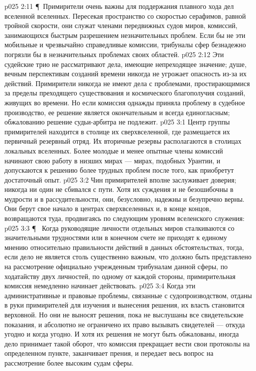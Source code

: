 \vs p025 2:11 \P\ Примирители очень важны для поддержания плавного хода дел вселенной вселенных. Пересекая пространство со скоростью серафимов, равной тройной скорости, они служат членами передвижных судов миров, комиссий, занимающихся быстрым разрешением незначительных проблем. Если бы не эти мобильные и чрезвычайно справедливые комиссии, трибуналы сфер безнадежно погрязли бы в незначительных проблемах своих областей.
\vs p025 2:12 Эти судейские трио не рассматривают дела, имеющие непреходящее значение; душе, вечным перспективам созданий времени никогда не угрожает опасность из\hyp{}за их действий. Примирители никогда не имеют дела с проблемами, простирающимися за пределы преходящего существования и космического благополучия созданий, живущих во времени. Но если комиссия однажды приняла проблему в судебное производство, ее решение является окончательным и всегда единогласным; обжалованию решение судьи\hyp{}арбитра не подлежит.
\vs p025 3:1 Центр группы примирителей находится в столице их сверхвселенной, где размещается их первичный резервный отряд. Их вторичные резервы располагаются в столицах локальных вселенных. Более молодые и менее опытные члены комиссий начинают свою работу в низших мирах --- мирах, подобных Урантии, и допускаются к решению более трудных проблем после того, как приобретут достаточный опыт.
\vs p025 3:2 Чин примирителей вполне заслуживает доверия; никогда ни один не сбивался с пути. Хотя их суждения и не безошибочны в мудрости и в рассудительности, они, безусловно, надежны и безупречно верны. Они берут свое начало в центрах сверхвселенных и, в конце концов, возвращаются туда, продвигаясь по следующим уровням вселенского служения:
\vs p025 3:3 \P\ \bibnobreakspace {} Когда руководящие личности отдельных миров сталкиваются со значительными трудностями или в конечном счете не приходят к единому мнению относительно правильности действий в данных обстоятельствах, тогда, если дело не является столь существенно важным, что должно быть представлено на рассмотрение официально учрежденным трибуналам данной сферы, по ходатайству двух личностей, по одному от каждой стороны, примирительная комиссия немедленно начинает действовать.
\vs p025 3:4 Когда эти административные и правовые проблемы, связанные с судопроизводством, отданы в руки примирителей для изучения и вынесения решения, их власть становится верховной. Но они не выносят решения, пока не выслушаны все свидетельские показания, и абсолютно не ограничено их право вызывать свидетелей --- откуда угодно и когда угодно. И хотя их решения не могут быть обжалованы, иногда дело принимает такой оборот, что комиссия прекращает вести свои протоколы на определенном пункте, заканчивает прения, и передает весь вопрос на рассмотрение более высоким судам сферы.

